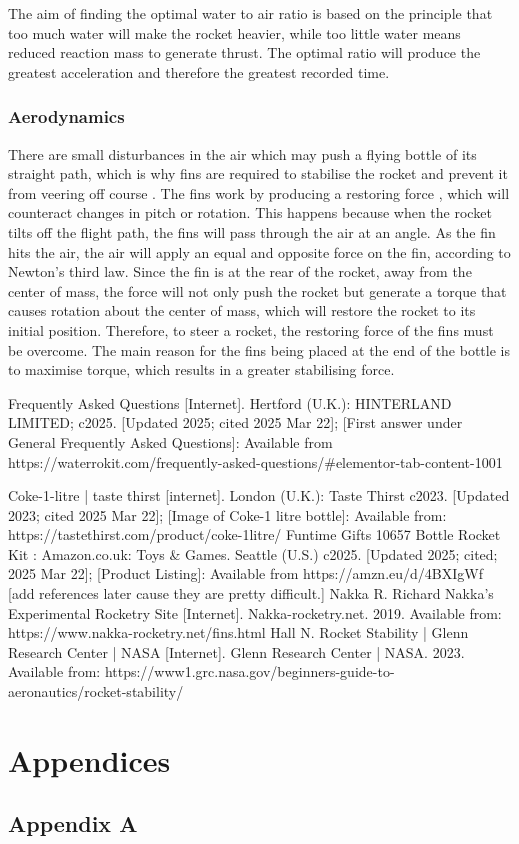 \documentclass[14pt]{article}
\begin{document}
The aim of finding the optimal water to air ratio is based on the principle that too much water will make the rocket heavier, while too little water means reduced reaction mass to generate thrust. The optimal ratio will produce the greatest acceleration and therefore the greatest recorded time. 
\subsubsection{Aerodynamics}
There are small disturbances in the air which may push a flying bottle of its straight path, which is why fins are required to stabilise the rocket and prevent it from veering off course \cite{4}. The fins work by producing a restoring force \cite{5}, which will counteract changes in pitch or rotation. This happens because when the rocket tilts off the flight path, the fins will pass through the air at an angle. As the fin hits the air, the air will apply
an equal and opposite force on the fin, according to Newton's third law. Since the fin is at the rear of the rocket, away from the center of mass,
the force will not only push the rocket but generate a torque that causes rotation about the center of mass, which will restore the rocket to its initial position.  Therefore,
to steer a rocket, the restoring force of the fins must be overcome.
The main reason for the fins being placed at the end of the bottle is to maximise torque, which results in a greater stabilising force.
\begin{thebibliography}{0}
Frequently Asked Questions [Internet]. Hertford (U.K.): HINTERLAND LIMITED; c2025. [Updated 2025; cited 2025 Mar 22]; [First answer under General Frequently Asked Questions]: Available from https://waterrokit.com/frequently-asked-questions/\#elementor-tab-content-1001

Coke-1-litre | taste thirst [internet]. London (U.K.): Taste Thirst c2023. [Updated 2023; cited 2025 Mar 22]; [Image of Coke-1 litre bottle]: Available from: https://tastethirst.com/product/coke-1litre/
Funtime Gifts 10657 Bottle Rocket Kit : Amazon.co.uk: Toys \& Games. Seattle (U.S.) c2025. [Updated 2025; cited; 2025 Mar 22]; [Product Listing]: Available from https://amzn.eu/d/4BXIgWf
[add references later cause they are pretty difficult.]
Nakka R. Richard Nakka’s Experimental Rocketry Site [Internet]. Nakka-rocketry.net. 2019. Available from: https://www.nakka-rocketry.net/fins.html
Hall N. Rocket Stability | Glenn Research Center | NASA [Internet]. Glenn Research Center | NASA. 2023. Available from: https://www1.grc.nasa.gov/beginners-guide-to-aeronautics/rocket-stability/
\end{thebibliography}

\section{Appendices}
\subsection{Appendix A}
\label {Appendix A}
\end{document}
